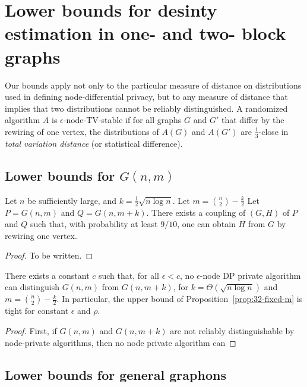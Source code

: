 
\section{Lower bounds for desinty estimation in one- and two- block graphs}
\label{sec:lower}

\begin{remark} Our bounds apply not only to the particular measure of
  distance on distributions used in defining node-differential
  privacy, but to any measure of distance that implies that two
  distributions cannot be reliably distinguished. A randomized
  algorithm $A$ is $\epsilon$-node-TV-stable if for all graphs $G$ and
  $G'$ that differ by the rewiring of one vertex, the distributions of
  $A(G)$ and $A(G')$ are $\tfrac 1 3$-close in \emph{total variation
    distance} (or statistical difference). 
\end{remark}

\subsection{Lower bounds for $G(n,m)$} \label{sec:lower-one-block}

\begin{proposition}
  Let $n$ be sufficiently large, and $k = \tfrac 1 2 \sqrt{n \log n}$. Let $m = {\binom n 2} - \frac k 2$
  Let $P = G(n,m)$ and $Q = G(n,m +k )$.   
  There exists a coupling of $(G,H)$ of $P$ and $Q$ such that, with probability at least $9/10$, one can obtain $H$ from $G$ by rewiring one vertex.  
\end{proposition}

\begin{proof}
  To be written.
\end{proof}

\begin{theorem}
  There exists a constant $c$ such that, for all $\epsilon< c$, no
  $\epsilon$-node DP private algorithm can distinguish $G(n,m)$ from
  $G(n,m +k )$, for $k = \Theta(\sqrt{n \log n})$ and $m = \binom n 2
  - \tfrac k 2$. In particular, the upper bound of
  Proposition~\ref{prop:32-fixed-m} is tight for constant $\epsilon$
  and $\rho$. 
\end{theorem}

\begin{proof}
  First, if $G(n,m)$ and
  $G(n,m +k )$ are not reliably distinguishable by node-private
  algorithms, then no node private algorithm can 

  
\end{proof}

\subsection{Lower bounds for general graphons}
\label{sec:lower-one-block}












